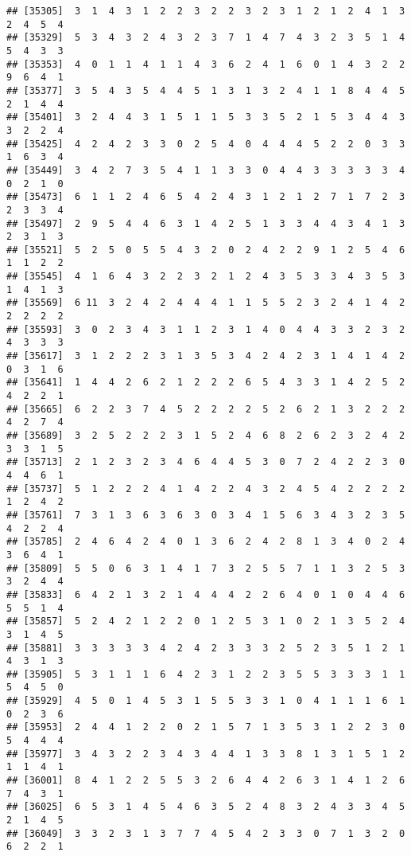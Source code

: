 \documentclass[
]{article}
\begin{document}
\begin{verbatim}
## [35305]  3  1  4  3  1  2  2  3  2  2  3  2  3  1  2  1  2  4  1  3  2  4  5  4
## [35329]  5  3  4  3  2  4  3  2  3  7  1  4  7  4  3  2  3  5  1  4  5  4  3  3
## [35353]  4  0  1  1  4  1  1  4  3  6  2  4  1  6  0  1  4  3  2  2  9  6  4  1
## [35377]  3  5  4  3  5  4  4  5  1  3  1  3  2  4  1  1  8  4  4  5  2  1  4  4
## [35401]  3  2  4  4  3  1  5  1  1  5  3  3  5  2  1  5  3  4  4  3  3  2  2  4
## [35425]  4  2  4  2  3  3  0  2  5  4  0  4  4  4  5  2  2  0  3  3  1  6  3  4
## [35449]  3  4  2  7  3  5  4  1  1  3  3  0  4  4  3  3  3  3  3  4  0  2  1  0
## [35473]  6  1  1  2  4  6  5  4  2  4  3  1  2  1  2  7  1  7  2  3  2  3  3  4
## [35497]  2  9  5  4  4  6  3  1  4  2  5  1  3  3  4  4  3  4  1  3  2  3  1  3
## [35521]  5  2  5  0  5  5  4  3  2  0  2  4  2  2  9  1  2  5  4  6  1  1  2  2
## [35545]  4  1  6  4  3  2  2  3  2  1  2  4  3  5  3  3  4  3  5  3  1  4  1  3
## [35569]  6 11  3  2  4  2  4  4  4  1  1  5  5  2  3  2  4  1  4  2  2  2  2  2
## [35593]  3  0  2  3  4  3  1  1  2  3  1  4  0  4  4  3  3  2  3  2  4  3  3  3
## [35617]  3  1  2  2  2  3  1  3  5  3  4  2  4  2  3  1  4  1  4  2  0  3  1  6
## [35641]  1  4  4  2  6  2  1  2  2  2  6  5  4  3  3  1  4  2  5  2  4  2  2  1
## [35665]  6  2  2  3  7  4  5  2  2  2  2  5  2  6  2  1  3  2  2  2  4  2  7  4
## [35689]  3  2  5  2  2  2  3  1  5  2  4  6  8  2  6  2  3  2  4  2  3  3  1  5
## [35713]  2  1  2  3  2  3  4  6  4  4  5  3  0  7  2  4  2  2  3  0  4  4  6  1
## [35737]  5  1  2  2  2  4  1  4  2  2  4  3  2  4  5  4  2  2  2  2  1  2  4  2
## [35761]  7  3  1  3  6  3  6  3  0  3  4  1  5  6  3  4  3  2  3  5  4  2  2  4
## [35785]  2  4  6  4  2  4  0  1  3  6  2  4  2  8  1  3  4  0  2  4  3  6  4  1
## [35809]  5  5  0  6  3  1  4  1  7  3  2  5  5  7  1  1  3  2  5  3  3  2  4  4
## [35833]  6  4  2  1  3  2  1  4  4  4  2  2  6  4  0  1  0  4  4  6  5  5  1  4
## [35857]  5  2  4  2  1  2  2  0  1  2  5  3  1  0  2  1  3  5  2  4  3  1  4  5
## [35881]  3  3  3  3  3  4  2  4  2  3  3  3  2  5  2  3  5  1  2  1  4  3  1  3
## [35905]  5  3  1  1  1  6  4  2  3  1  2  2  3  5  5  3  3  3  1  1  5  4  5  0
## [35929]  4  5  0  1  4  5  3  1  5  5  3  3  1  0  4  1  1  1  6  1  0  2  3  6
## [35953]  2  4  4  1  2  2  0  2  1  5  7  1  3  5  3  1  2  2  3  0  5  4  4  4
## [35977]  3  4  3  2  2  3  4  3  4  4  1  3  3  8  1  3  1  5  1  2  1  1  4  1
## [36001]  8  4  1  2  2  5  5  3  2  6  4  4  2  6  3  1  4  1  2  6  7  4  3  1
## [36025]  6  5  3  1  4  5  4  6  3  5  2  4  8  3  2  4  3  3  4  5  2  1  4  5
## [36049]  3  3  2  3  1  3  7  7  4  5  4  2  3  3  0  7  1  3  2  0  6  2  2  1

\end{verbatim}
\end{document}
